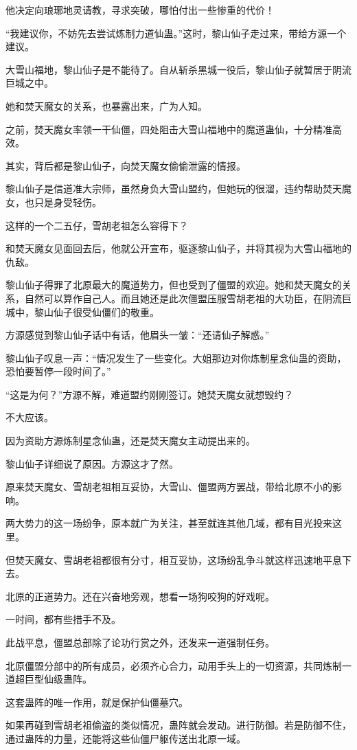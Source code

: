 \begin{this_body}
他决定向琅琊地灵请教，寻求突破，哪怕付出一些惨重的代价！

“我建议你，不妨先去尝试炼制力道仙蛊。”这时，黎山仙子走过来，带给方源一个建议。

大雪山福地，黎山仙子是不能待了。自从斩杀黑城一役后，黎山仙子就暂居于阴流巨城之中。

她和焚天魔女的关系，也暴露出来，广为人知。

之前，焚天魔女率领一干仙僵，四处阻击大雪山福地中的魔道蛊仙，十分精准高效。

其实，背后都是黎山仙子，向焚天魔女偷偷泄露的情报。

黎山仙子是信道准大宗师，虽然身负大雪山盟约，但她玩的很溜，违约帮助焚天魔女，也只是身受轻伤。

这样的一个二五仔，雪胡老祖怎么容得下？

和焚天魔女见面回去后，他就公开宣布，驱逐黎山仙子，并将其视为大雪山福地的仇敌。

黎山仙子得罪了北原最大的魔道势力，但也受到了僵盟的欢迎。她和焚天魔女的关系，自然可以算作自己人。而且她还是此次僵盟压服雪胡老祖的大功臣，在阴流巨城中，黎山仙子很受仙僵们的敬重。

方源感觉到黎山仙子话中有话，他眉头一皱：“还请仙子解惑。”

黎山仙子叹息一声：“情况发生了一些变化。大姐那边对你炼制星念仙蛊的资助，恐怕要暂停一段时间了。”

“这是为何？”方源不解，难道盟约刚刚签订。她焚天魔女就想毁约？

不大应该。

因为资助方源炼制星念仙蛊，还是焚天魔女主动提出来的。

黎山仙子详细说了原因。方源这才了然。

原来焚天魔女、雪胡老祖相互妥协，大雪山、僵盟两方罢战，带给北原不小的影响。

两大势力的这一场纷争，原本就广为关注，甚至就连其他几域，都有目光投来这里。

但焚天魔女、雪胡老祖都很有分寸，相互妥协，这场纷乱争斗就这样迅速地平息下去。

北原的正道势力。还在兴奋地旁观，想看一场狗咬狗的好戏呢。

一时间，都有些措手不及。

此战平息，僵盟总部除了论功行赏之外，还发来一道强制任务。

北原僵盟分部中的所有成员，必须齐心合力，动用手头上的一切资源，共同炼制一道超巨型仙级蛊阵。

这套蛊阵的唯一作用，就是保护仙僵墓穴。

如果再碰到雪胡老祖偷盗的类似情况，蛊阵就会发动。进行防御。若是防御不住，通过蛊阵的力量，还能将这些仙僵尸躯传送出北原一域。


\end{this_body}
